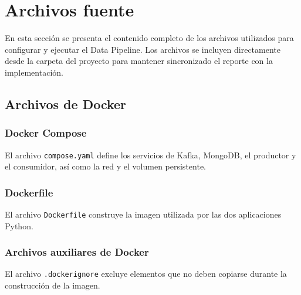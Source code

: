 \clearpage
\section{Archivos fuente}

En esta sección se presenta el contenido completo de los archivos utilizados
para configurar y ejecutar el Data Pipeline. Los archivos se incluyen
directamente desde la carpeta del proyecto para mantener sincronizado el
reporte con la implementación.

\lstset{
    basicstyle=\ttfamily\scriptsize,
    numbers=left,
    numberstyle=\tiny,
    numbersep=8pt,
    frame=single,
    breaklines=true,
    breakatwhitespace=false,
    showstringspaces=false,
    keepspaces=true,
    tabsize=4,
    captionpos=b
}

\subsection{Archivos de Docker}

\subsubsection{Docker Compose}

El archivo \texttt{compose.yaml} define los servicios de Kafka, MongoDB,
el productor y el consumidor, así como la red y el volumen persistente.



\subsubsection{Dockerfile}

El archivo \texttt{Dockerfile} construye la imagen utilizada por las dos
aplicaciones Python.



\subsubsection{Archivos auxiliares de Docker}

El archivo \texttt{.dockerignore} excluye elementos que no deben copiarse
durante la construcción de la imagen.


